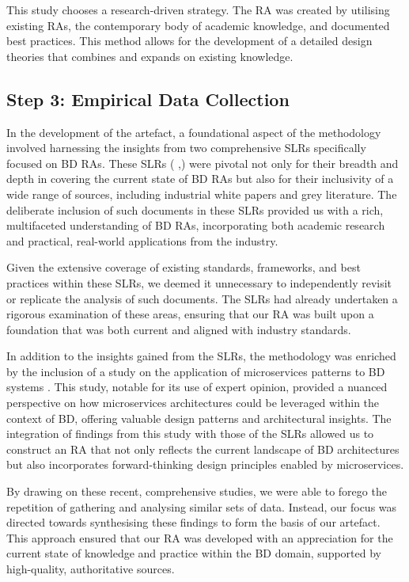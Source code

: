 \documentclass[preprint,12pt]{elsarticle}
\begin{document}
This study chooses a research-driven strategy. The RA was created by utilising existing RAs, the contemporary body of academic knowledge, and documented best practices. This method allows for the development of a detailed design theories that combines and expands on existing knowledge.

\subsection{Step 3: Empirical Data Collection} \label{theSLR}

In the development of the artefact, a foundational aspect of the methodology involved harnessing the insights from two comprehensive SLRs specifically focused on BD RAs. These SLRs (\cite{ataei2022state} ,\cite{AtaeiACIS}) were pivotal not only for their breadth and depth in covering the current state of BD RAs but also for their inclusivity of a wide range of sources, including industrial white papers and grey literature. The deliberate inclusion of such documents in these SLRs provided us with a rich, multifaceted understanding of BD RAs, incorporating both academic research and practical, real-world applications from the industry.

Given the extensive coverage of existing standards, frameworks, and best practices within these SLRs, we deemed it unnecessary to independently revisit or replicate the analysis of such documents. The SLRs had already undertaken a rigorous examination of these areas, ensuring that our RA was built upon a foundation that was both current and aligned with industry standards.

In addition to the insights gained from the SLRs, the methodology was enriched by the inclusion of a study on the application of microservices patterns to BD systems \cite{ataei2023application}. This study, notable for its use of expert opinion, provided a nuanced perspective on how microservices architectures could be leveraged within the context of BD, offering valuable design patterns and architectural insights. The integration of findings from this study with those of the SLRs allowed us to construct an RA that not only reflects the current landscape of BD architectures but also incorporates forward-thinking design principles enabled by microservices.

By drawing on these recent, comprehensive studies, we were able to forego the repetition of gathering and analysing similar sets of data. Instead, our focus was directed towards synthesising these findings to form the basis of our artefact. This approach ensured that our RA was developed with an appreciation for the current state of knowledge and practice within the BD domain, supported by high-quality, authoritative sources. 
\end{document}
